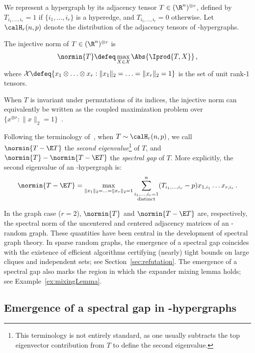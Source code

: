 \documentclass[11pt,a4paper]{article}
\begin{document}
\noindent We represent a hypergraph
by its adjacency tensor $T\in (\R^n)^{\otimes r}$, defined by $T_{i_1,\ldots,i_r}=1$
if $\{i_1, \ldots, i_r\}$
is a hyperedge, and $T_{i_1, \ldots, i_r}=0$
otherwise.
Let $\calH_r(n,p)$ 
denote the distribution of the 
adjacency tensors
of \Erdos-\Renyi hypergraphs.

\begin{definition}
    The injective norm of $T\in (\R^n)^{\otimes r}$ is
    \begin{equation*}
        \normin{T} \defeq \max_{X\in \mathcal X} \Abs{\Iprod{T, X}}\,,
    \end{equation*}
    where $\mathcal X \defeq \{x_1\otimes \ldots \otimes x_r : \|x_1\|_2= \ldots= \|x_r\|_2 = 1\}$ is the set
    of unit rank-1 tensors.
\end{definition}

When $T$ is
invariant under permutations of its indices,
the injective norm can equivalently be written as
the coupled
maximization problem over $\{x^{\otimes r} : \|x\|_2 = 1\}$~\cite{ancestralPaper}.

Following the terminology of~\cite{friedmanWigderson}, when $T\sim \calH_r(n,p)$, we call
$\normin{T-\E  T}$ the {\em second eigenvalue}\footnote{This terminology is not entirely standard, as one usually subtracts the top eigenvector contribution from $T$ to define the second eigenvalue.} of $T$,
and $\normin{T}-\normin{T-\E  T}$ the {\em spectral gap} of
$T$. More explicitly, the second eigenvalue of an \Erdos-\Renyi hypergraph is:
\[
    \normin{T - \E T} = \max_{\|x_1\|_2 = \ldots = \|x_r\|_2 = 1} \sum_{\substack{i_1,\ldots,i_r=1\\\text{distinct}}}^n (T_{i_1,\ldots,i_r} - p) x_{1,i_1}\ldots x_{r,i_r}\,.
\]

In the graph case ($r=2$), $\normin{ T}$ and $\normin{T-\E  T}$ are,
respectively, the spectral norm of the uncentered and centered adjacency
matrices of an \Erdos-\Renyi{} random graph. 
These quantities have been
central in the development of spectral graph theory. In sparse random graphs,
the emergence of a spectral gap coincides with the existence
of efficient algorithms certifying (nearly) tight bounds on large cliques and independent sets; see Section~\ref{sec:refutation}. The emergence of a spectral gap also marks the region in which the expander mixing lemma holds; see Example~\ref{ex:mixingLemma}.

\subsection{Emergence of a spectral gap in \Erdos-\Renyi hypergraphs}
\end{document}
